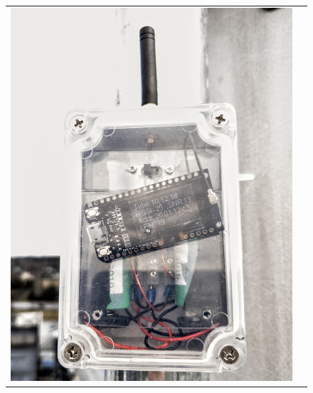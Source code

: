 \documentclass[12pt]{article}
\begin{document}
    \begin{figure} [htbp]
        \begin{tabular}{c c}
            \begin{minipage}{0.42\textwidth}
                \includegraphics[width=\textwidth]{figures/ttn-jaam.jpeg}
            \end{minipage}
            &
            \begin{minipage}{0.53\textwidth}

\end{minipage}
\end{tabular}
\end{figure}
\end{document}
